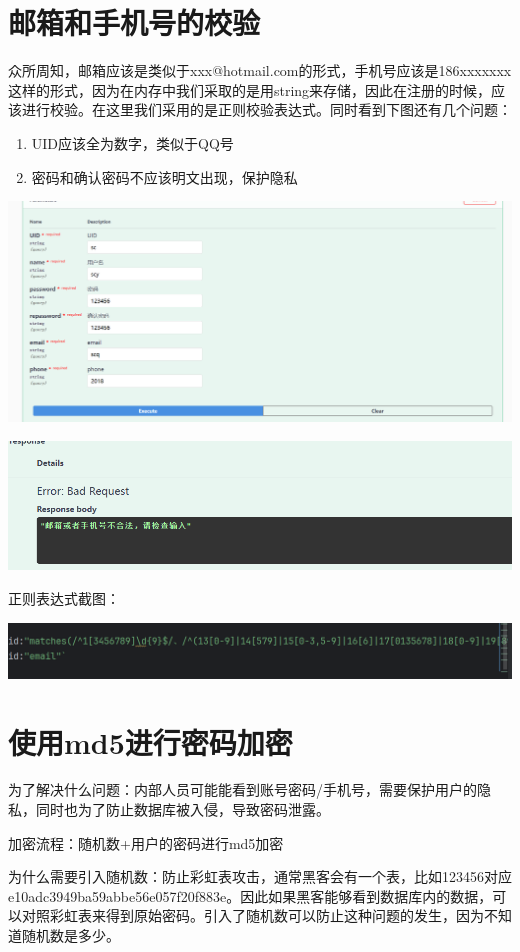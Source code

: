 \documentclass[12pt]{article}
\begin{document}
	\section{邮箱和手机号的校验}
	众所周知，邮箱应该是类似于xxx@hotmail.com的形式，手机号应该是186xxxxxxx这样的形式，因为在内存中我们采取的是用string来存储，因此在注册的时候，应该进行校验。在这里我们采用的是正则校验表达式。同时看到下图还有几个问题：
	\begin{enumerate}
		\item UID应该全为数字，类似于QQ号
		\item 密码和确认密码不应该明文出现，保护隐私
	\end{enumerate}
	
	\includegraphics{16.png}
	
	\includegraphics{17.png}
	
	正则表达式截图：
	
	\includegraphics{18.png}
	
	\section{使用md5进行密码加密}
	为了解决什么问题：内部人员可能能看到账号密码/手机号，需要保护用户的隐私，同时也为了防止数据库被入侵，导致密码泄露。
	
	加密流程：随机数+用户的密码进行md5加密
	
	为什么需要引入随机数：防止彩虹表攻击，通常黑客会有一个表，比如123456对应e10adc3949ba59abbe56e057f20f883e。因此如果黑客能够看到数据库内的数据，可以对照彩虹表来得到原始密码。引入了随机数可以防止这种问题的发生，因为不知道随机数是多少。
	
\end{document}
